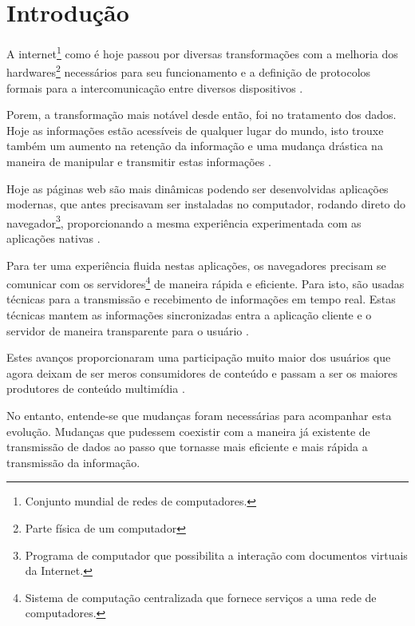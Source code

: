 \section{Introdução}


A internet\footnote{Conjunto mundial de redes de computadores.} como é hoje passou por diversas transformações com a melhoria dos hardwares\footnote{Parte física de um computador} necessários para seu funcionamento e a definição de protocolos formais para a intercomunicação entre diversos dispositivos \cite{Aghaei2012}.

Porem, a transformação mais notável desde então, foi no tratamento dos dados. Hoje as informações estão acessíveis de qualquer lugar do mundo, isto trouxe também um aumento na retenção da informação e uma mudança drástica na maneira de manipular e transmitir estas informações \cite{Leiner2009}.

Hoje as páginas web são mais dinâmicas podendo ser desenvolvidas aplicações modernas, que antes precisavam ser instaladas no computador, rodando direto do navegador\footnote{Programa de computador que possibilita a interação com documentos virtuais da Internet.},  proporcionando a mesma experiência experimentada com as aplicações nativas \cite{Garrett2005}.

Para ter uma experiência fluida nestas aplicações, os navegadores precisam se comunicar com os servidores\footnote{Sistema de computação centralizada que fornece serviços a uma rede de computadores.} de maneira rápida e eficiente. Para isto, são usadas técnicas para a transmissão e recebimento de informações em tempo real. Estas técnicas mantem as informações sincronizadas entra a aplicação cliente e o servidor de maneira transparente para o usuário \cite{offutt2002quality}.

Estes avanços proporcionaram uma participação muito maior dos usuários que agora deixam de ser meros consumidores de conteúdo e passam a ser os maiores produtores de conteúdo multimídia \cite{Aghaei2012}.

No entanto, entende-se que mudanças foram necessárias para acompanhar esta evolução. Mudanças que pudessem coexistir com a maneira já existente de transmissão de dados ao passo que tornasse mais eficiente e mais rápida a transmissão da informação.

